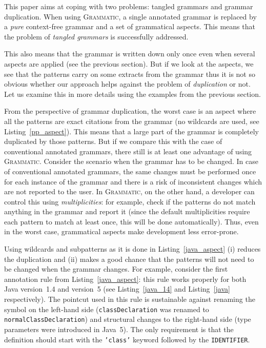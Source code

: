 \documentclass{IOS-Book-Article}     %
\newcommand{\lstref}[1]{Listing~\ref{#1}}
\newcommand{\tool}[1]{\textsc{#1}}
\newcommand{\Grammatic}[0]{\tool{Grammatic}}
\begin{document}
This paper aims at coping with two problems: tangled grammars and grammar duplication. 
When using \Grammatic{}, a single annotated grammar is replaced by a \emph{pure} context-free grammar and a set of grammatical aspects. This means that the problem of \emph{tangled grammars} is successfully addressed.

This also means that the grammar is written down only once even when several aspects are applied (see the previous section). But if we look at the aspects, we see that the patterns carry on some extracts from the grammar thus it is not so obvious whether our approach helps against the problem of \emph{duplication} or not. Let us examine this in more details using the examples from the previous section.

From the perspective of grammar duplication, the worst case is an aspect where all the patterns are exact citations from the grammar (no wildcards are used, see \lstref{pp_aspect}). This means that a large part of the grammar is completely duplicated by those patterns. But if we compare this with the case of conventional annotated grammars, there still is at least one advantage of using \Grammatic{}. Consider the scenario when the grammar has to be changed. In case of conventional annotated grammars, the same changes must be performed once for each instance of the grammar and there is a risk of inconsistent changes which are not reported to the user. In \Grammatic{}, on the other hand, a developer can control this using \emph{multiplicities}: for example, check if the patterns do not match anything in the grammar and report it (since the default multiplicities require each pattern to match at least once, this will be done automatically). Thus, even in the worst case, grammatical aspects make development less error-prone.

Using wildcards and subpatterns as it is done in \lstref{java_aspect} (i) reduces the duplication and (ii) makes a good chance that the patterns will not need to be changed when the grammar changes. For example, consider the first annotation rule from \lstref{java_aspect}: this rule works properly for both Java version~1.4 and version~5 (see \lstref{java_14} and \lstref{java} respectively). The pointcut used in this rule is sustainable against renaming the symbol on the left-hand side (\texttt{classDeclaration} was renamed to \texttt{normalClassDeclaration}) and structural changes to the right-hand side (type parameters were introduced in Java~5). The only requirement is that the definition should start with the \texttt{'class'} keyword followed by the \texttt{IDENTIFIER}.
\end{document}
